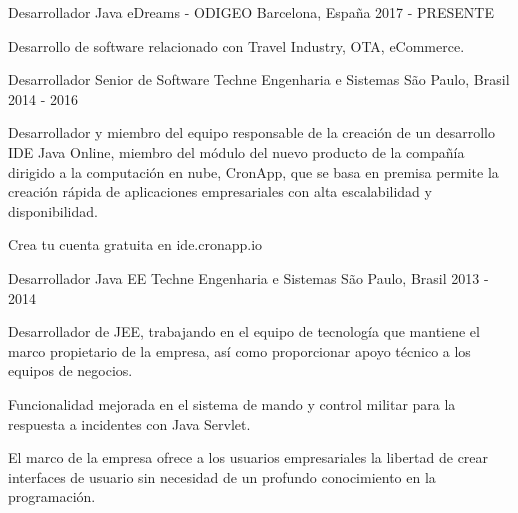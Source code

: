 

\begin{cventries}

  \cventry
    {Desarrollador Java} %
    {eDreams - ODIGEO} %
    {Barcelona, España} %
    {2017 - PRESENTE} %
    {
      \begin{cvitems} %
        \item {Desarrollo de software relacionado con Travel Industry, OTA, eCommerce.}
      \end{cvitems}
    }

  \cventry
    {Desarrollador Senior de Software} %
    {Techne Engenharia e Sistemas} %
    {São Paulo, Brasil} %
    {2014 - 2016} %
    {
      \begin{cvitems} %
        \item {Desarrollador y miembro del equipo responsable de la creación de un desarrollo IDE Java Online, miembro del módulo del nuevo producto de la compañía dirigido a la computación en nube, CronApp, que se basa en premisa permite la creación rápida de aplicaciones empresariales con alta escalabilidad y disponibilidad.}
        \item {Crea tu cuenta gratuita en ide.cronapp.io}
      \end{cvitems}
    }

  \cventry
    {Desarrollador Java EE} %
    {Techne Engenharia e Sistemas} %
    {São Paulo, Brasil} %
    {2013 - 2014} %
    {
      \begin{cvitems} %
        \item {Desarrollador de JEE, trabajando en el equipo de tecnología que mantiene el marco propietario de la empresa, así como proporcionar apoyo técnico a los equipos de negocios.}
        \item {Funcionalidad mejorada en el sistema de mando y control militar para la respuesta a incidentes con Java Servlet.}
        \item {El marco de la empresa ofrece a los usuarios empresariales la libertad de crear interfaces de usuario sin necesidad de un profundo conocimiento en la programación.}
      \end{cvitems}
    }


\end{cventries}
